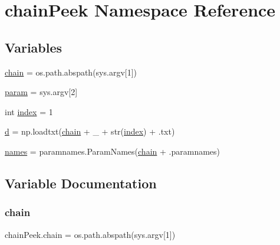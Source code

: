 \hypertarget{namespacechainPeek}{}\section{chain\+Peek Namespace Reference}
\label{namespacechainPeek}
\subsection*{Variables}
\begin{DoxyCompactItemize}
\item 
\mbox{\hyperlink{namespacechainPeek_a8430d0d56acea0fedb545d9da622d387}{chain}} = os.\+path.\+abspath(sys.\+argv\mbox{[}1\mbox{]})
\item 
\mbox{\hyperlink{namespacechainPeek_a8a13d4184b76d34d205243badf66a307}{param}} = sys.\+argv\mbox{[}2\mbox{]}
\item 
int \mbox{\hyperlink{namespacechainPeek_a3720d3f634009a2cf9db4482221c6aa0}{index}} = 1
\item 
\mbox{\hyperlink{namespacechainPeek_a75fbbfe137edd9e05e4a3118cb22c726}{d}} = np.\+loadtxt(\mbox{\hyperlink{namespacechainPeek_a8430d0d56acea0fedb545d9da622d387}{chain}} + \textquotesingle{}\+\_\+\textquotesingle{} + str(\mbox{\hyperlink{namespacechainPeek_a3720d3f634009a2cf9db4482221c6aa0}{index}}) + \textquotesingle{}.txt\textquotesingle{})
\item 
\mbox{\hyperlink{namespacechainPeek_a39ef5b3ddd1639f887a8ed958fe9c053}{names}} = paramnames.\+Param\+Names(\mbox{\hyperlink{namespacechainPeek_a8430d0d56acea0fedb545d9da622d387}{chain}} + \textquotesingle{}.paramnames\textquotesingle{})
\end{DoxyCompactItemize}


\subsection{Variable Documentation}
\mbox{\label{namespacechainPeek_a8430d0d56acea0fedb545d9da622d387}} 
\subsubsection{\texorpdfstring{chain}{chain}}
{\footnotesize\ttfamily chain\+Peek.\+chain = os.\+path.\+abspath(sys.\+argv\mbox{[}1\mbox{]})}

\mbox{\label{namespacechainPeek_a75fbbfe137edd9e05e4a3118cb22c726}} 
